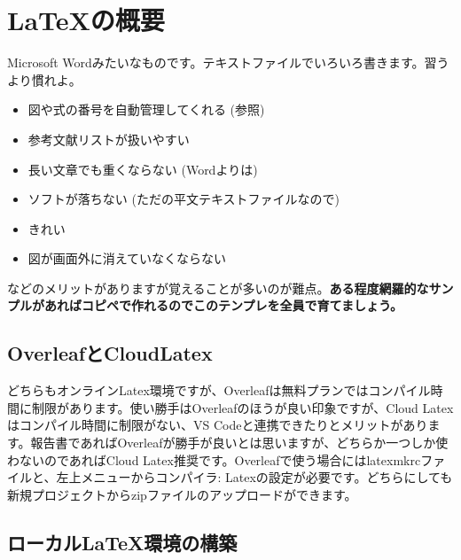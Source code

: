 \documentclass[uplatex,dvipdfmx,a4j,11pt]{jsarticle}
\begin{document}
\maketitlepage

\noheadergeometry
{}
\tableofcontents
\newpage
\normalgeometry


\section{\LaTeX の概要}

Microsoft Wordみたいなものです。テキストファイルでいろいろ書きます。習うより慣れよ。
\begin{itemize}
    \item 図や式の番号を自動管理してくれる (参照)
    \item 参考文献リストが扱いやすい
    \item 長い文章でも重くならない (Wordよりは)
    \item ソフトが落ちない (ただの平文テキストファイルなので)
    \item きれい
    \item 図が画面外に消えていなくならない
\end{itemize}
などのメリットがありますが覚えることが多いのが難点。\textbf{ある程度網羅的なサンプルがあればコピペで作れるのでこのテンプレを全員で育てましょう。}

\subsection{OverleafとCloudLatex}

どちらもオンラインLatex環境ですが、Overleafは無料プランではコンパイル時間に制限があります。使い勝手はOverleafのほうが良い印象ですが、Cloud Latexはコンパイル時間に制限がない、VS Codeと連携できたりとメリットがあります。報告書であればOverleafが勝手が良いとは思いますが、どちらか一つしか使わないのであればCloud Latex推奨です。Overleafで使う場合にはlatexmkrcファイルと、左上メニューからコンパイラ: Latexの設定が必要です。どちらにしても新規プロジェクトからzipファイルのアップロードができます。

\subsection{ローカル\LaTeX 環境の構築}
\end{document}
